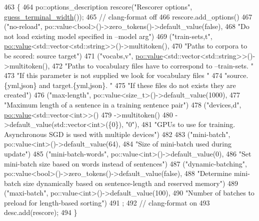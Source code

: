 \begin{DoxyCode}
463                                                                 \{
464   po::options\_description rescore(\textcolor{stringliteral}{"Rescorer options"}, \hyperlink{namespacemarian_aa656da9ccb3e53462fef9b9745616b57}{guess\_terminal\_width}());
465   \textcolor{comment}{// clang-format off}
466   rescore.add\_options()
467     (\textcolor{stringliteral}{"no-reload"}, po::value<bool>()->zero\_tokens()->default\_value(\textcolor{keyword}{false}),
468       \textcolor{stringliteral}{"Do not load existing model specified in --model arg"})
469     (\textcolor{stringliteral}{"train-sets,t"}, \hyperlink{namespacemarian_1_1keywords_ac70de1b4c3cf6b7080cf5086f2963fd8}{po::value}<std::vector<std::string>>()->multitoken(),
470       \textcolor{stringliteral}{"Paths to corpora to be scored: source target"})
471     (\textcolor{stringliteral}{"vocabs,v"}, \hyperlink{namespacemarian_1_1keywords_ac70de1b4c3cf6b7080cf5086f2963fd8}{po::value}<std::vector<std::string>>()->multitoken(),
472       \textcolor{stringliteral}{"Paths to vocabulary files have to correspond to --train-sets. "}
473       \textcolor{stringliteral}{"If this parameter is not supplied we look for vocabulary files "}
474       \textcolor{stringliteral}{"source.\{yml,json\} and target.\{yml,json\}. "}
475       \textcolor{stringliteral}{"If these files do not exists they are created"})
476     (\textcolor{stringliteral}{"max-length"}, po::value<size\_t>()->default\_value(1000),
477       \textcolor{stringliteral}{"Maximum length of a sentence in a training sentence pair"})
478     (\textcolor{stringliteral}{"devices,d"}, \hyperlink{namespacemarian_1_1keywords_ac70de1b4c3cf6b7080cf5086f2963fd8}{po::value}<std::vector<int>>()
479       ->multitoken()
480       ->default\_value(std::vector<int>(\{0\}), \textcolor{stringliteral}{"0"}),
481       \textcolor{stringliteral}{"GPUs to use for training. Asynchronous SGD is used with multiple devices"})
482 
483     (\textcolor{stringliteral}{"mini-batch"}, po::value<int>()->default\_value(64),
484       \textcolor{stringliteral}{"Size of mini-batch used during update"})
485     (\textcolor{stringliteral}{"mini-batch-words"}, po::value<int>()->default\_value(0),
486       \textcolor{stringliteral}{"Set mini-batch size based on words instead of sentences"})
487     (\textcolor{stringliteral}{"dynamic-batching"}, po::value<bool>()->zero\_tokens()->default\_value(\textcolor{keyword}{false}),
488       \textcolor{stringliteral}{"Determine mini-batch size dynamically based on sentence-length and reserved memory"})
489     (\textcolor{stringliteral}{"maxi-batch"}, po::value<int>()->default\_value(100),
490       \textcolor{stringliteral}{"Number of batches to preload for length-based sorting"})
491     ;
492   \textcolor{comment}{// clang-format on}
493   desc.add(rescore);
494 \}
\end{DoxyCode}


